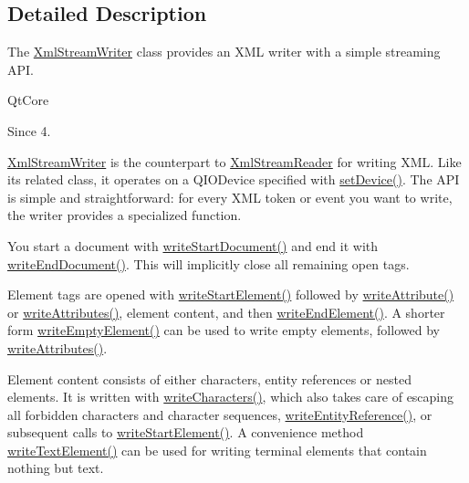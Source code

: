 \subsection{Detailed Description}
The \hyperlink{class_xml_stream_writer}{Xml\+Stream\+Writer} class provides an X\+ML writer with a simple streaming A\+PI. 

Qt\+Core \begin{DoxySince}{Since}
4. 
\end{DoxySince}
\hyperlink{class_xml_stream_writer}{Xml\+Stream\+Writer} is the counterpart to \hyperlink{class_xml_stream_reader}{Xml\+Stream\+Reader} for writing X\+ML. Like its related class, it operates on a Q\+I\+O\+Device specified with \hyperlink{class_xml_stream_writer_ac03d4a48cc662d5c43a136560f514fd3}{set\+Device()}. The A\+PI is simple and straightforward\+: for every X\+ML token or event you want to write, the writer provides a specialized function.

You start a document with \hyperlink{class_xml_stream_writer_ae9d5ccf2e94485352e4c1c8843dc0641}{write\+Start\+Document()} and end it with \hyperlink{class_xml_stream_writer_a4fa078ed52892cec544e890efb1c3b50}{write\+End\+Document()}. This will implicitly close all remaining open tags.

Element tags are opened with \hyperlink{class_xml_stream_writer_aa001c660c1df012b4e37773aa219c379}{write\+Start\+Element()} followed by \hyperlink{class_xml_stream_writer_a685d12dc71870e20e835085b6326787b}{write\+Attribute()} or \hyperlink{class_xml_stream_writer_a401845495b28fcc27a7f491ac402ea47}{write\+Attributes()}, element content, and then \hyperlink{class_xml_stream_writer_add89e8f61a141e2b320cf2b567e7edfb}{write\+End\+Element()}. A shorter form \hyperlink{class_xml_stream_writer_a07e058f896327e9236e7c19132842cf2}{write\+Empty\+Element()} can be used to write empty elements, followed by \hyperlink{class_xml_stream_writer_a401845495b28fcc27a7f491ac402ea47}{write\+Attributes()}.

Element content consists of either characters, entity references or nested elements. It is written with \hyperlink{class_xml_stream_writer_aea9dab80ea787794736d3f2a524780e5}{write\+Characters()}, which also takes care of escaping all forbidden characters and character sequences, \hyperlink{class_xml_stream_writer_aeea05577f7ecd0eaa34b4237fdbe446d}{write\+Entity\+Reference()}, or subsequent calls to \hyperlink{class_xml_stream_writer_aa001c660c1df012b4e37773aa219c379}{write\+Start\+Element()}. A convenience method \hyperlink{class_xml_stream_writer_a3c1e28db26255b0a88745ac76e84485e}{write\+Text\+Element()} can be used for writing terminal elements that contain nothing but text.

